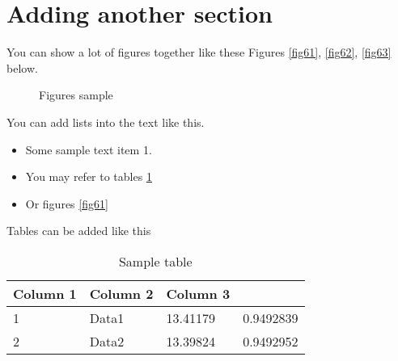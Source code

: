 \section{Adding another section}
You can show a lot of figures together like these Figures \ref{fig61}, \ref{fig62}, \ref{fig63} below.
\begin{figure} [!htbp]
\centering    
{}
\caption{Figures sample}
\end{figure}
You can add lists into the text like this. 
\begin{itemize}
\settowidth{\leftmargin}{{\Large$\square$}}\advance\leftmargin{}
\itemsep3pt\relax
\renewcommand\labelitemi{{\lower1pt\hbox{\small$\square$}}}
\item	Some sample text item 1. 
\item You may refer to tables \ref{tab1} 
\item Or figures \ref{fig61}
\end{itemize}

Tables can be added like this
\begin{table}[!htbp]
\centering
\caption{Sample table}
\label{tab1}
\begin{tabular}{llll}

\hline
Column 1 & Column 2 & Column 3       \\\hline
1         & Data1 & 13.41179 & 0.9492839 \\
2            & Data2 & 13.39824 & 0.9492952\\\hline
\end{tabular}
\end{table}



